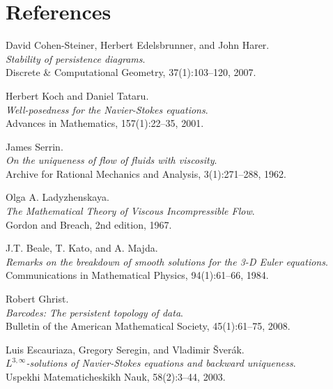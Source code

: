 \documentclass[11pt]{article}
\theoremstyle{definition}
\begin{document}
\section*{References}
\begin{thebibliography}{9}

David Cohen-Steiner, Herbert Edelsbrunner, and John Harer.\\
\textit{Stability of persistence diagrams}.\\
Discrete \& Computational Geometry, 37(1):103--120, 2007.

Herbert Koch and Daniel Tataru.\\
\textit{Well-posedness for the Navier-Stokes equations}.\\
Advances in Mathematics, 157(1):22--35, 2001.

James Serrin.\\
\textit{On the uniqueness of flow of fluids with viscosity}.\\
Archive for Rational Mechanics and Analysis, 3(1):271--288, 1962.

Olga A. Ladyzhenskaya.\\
\textit{The Mathematical Theory of Viscous Incompressible Flow}.\\
Gordon and Breach, 2nd edition, 1967.

J.T. Beale, T. Kato, and A. Majda.\\
\textit{Remarks on the breakdown of smooth solutions for the 3-D Euler equations}.\\
Communications in Mathematical Physics, 94(1):61--66, 1984.

Robert Ghrist.\\
\textit{Barcodes: The persistent topology of data}.\\
Bulletin of the American Mathematical Society, 45(1):61--75, 2008.

Luis Escauriaza, Gregory Seregin, and Vladimir Šverák.\\
\textit{$L^{3,\infty}$-solutions of Navier-Stokes equations and backward uniqueness}.\\
Uspekhi Matematicheskikh Nauk, 58(2):3–44, 2003.

\end{thebibliography}
\end{document}
